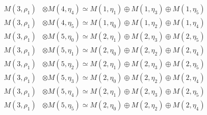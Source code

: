 \begin{align*}
M(3,\rho_{1}) &\otimes M(4,\eta_{4}) \simeq M(1,\eta_{1}) \oplus M(1,\eta_{3}) \oplus M(1,\eta_{5}) \\
M(3,\rho_{1}) &\otimes M(4,\eta_{5}) \simeq M(1,\eta_{0}) \oplus M(1,\eta_{2}) \oplus M(1,\eta_{4}) \\
M(3,\rho_{1}) &\otimes M(5,\eta_{0}) \simeq M(2,\eta_{1}) \oplus M(2,\eta_{3}) \oplus M(2,\eta_{5}) \\
M(3,\rho_{1}) &\otimes M(5,\eta_{1}) \simeq M(2,\eta_{0}) \oplus M(2,\eta_{2}) \oplus M(2,\eta_{4}) \\
M(3,\rho_{1}) &\otimes M(5,\eta_{2}) \simeq M(2,\eta_{1}) \oplus M(2,\eta_{3}) \oplus M(2,\eta_{5}) \\
M(3,\rho_{1}) &\otimes M(5,\eta_{3}) \simeq M(2,\eta_{0}) \oplus M(2,\eta_{2}) \oplus M(2,\eta_{4}) \\
M(3,\rho_{1}) &\otimes M(5,\eta_{4}) \simeq M(2,\eta_{1}) \oplus M(2,\eta_{3}) \oplus M(2,\eta_{5}) \\
M(3,\rho_{1}) &\otimes M(5,\eta_{5}) \simeq M(2,\eta_{0}) \oplus M(2,\eta_{2}) \oplus M(2,\eta_{4}) \\
\end{align*}

